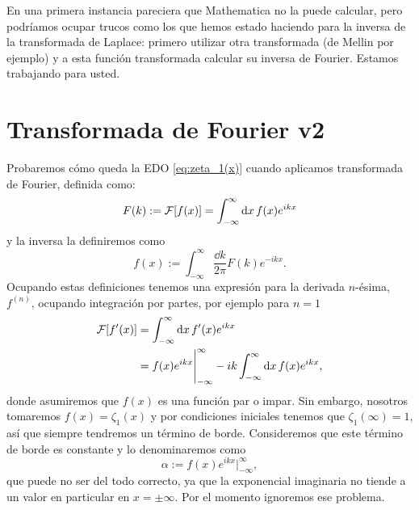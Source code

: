 \documentclass[%
 aip,
 jmp,%
 amsmath,amssymb,
 reprint,%
]{revtex4-2}
\begin{document}
En una primera instancia pareciera que Mathematica no la puede calcular, pero podr\'iamos ocupar trucos como los que hemos estado haciendo para la inversa de la transformada de Laplace: primero utilizar otra transformada (de Mellin por ejemplo) y a esta funci\'on transformada calcular su inversa de Fourier. Estamos trabajando para usted.

\newpage

\section{Transformada de Fourier v2}

Probaremos c\'omo queda la EDO \eqref{eq:zeta_1(x)} cuando aplicamos transformada de Fourier, definida como:
\begin{equation}
    F(k) := \mathcal{F}\qty[f(x)] = \int_{-\infty}^{\infty}\dd{x}f(x)e^{ikx}
\end{equation}
y la inversa la definiremos como
\begin{equation}
    f(x) := \int_{-\infty}^{\infty}\frac{\dd{k}}{2\pi}F(k)e^{-ikx}.
\end{equation}
Ocupando estas definiciones tenemos una expresi\'on para la derivada $n$-\'esima, $f^{(n)}$, ocupando integraci\'on por partes, por ejemplo para $n=1$
\begin{equation*}
\begin{aligned}
    \mathcal{F}\qty[f'(x)] &= \int_{-\infty}^{\infty} \dd{x} f'(x)e^{ikx}\\
    &= f(x)e^{ikx}\Bigg|_{-\infty}^\infty - ik\int_{-\infty}^{\infty} \dd{x} f(x)e^{ikx},
\end{aligned}
\end{equation*}
donde asumiremos que $f(x)$ es una funci\'on par o impar. Sin embargo, nosotros tomaremos $f(x) = \zeta_1(x)$ y por condiciones iniciales tenemos que $\zeta_1(\infty) = 1$, as\'i que siempre tendremos un t\'ermino de borde. Consideremos que este t\'ermino de borde es constante y lo denominaremos como
\begin{equation*}
    \alpha := f(x)e^{ikx}\Bigg|_{-\infty}^\infty,
\end{equation*}
que puede no ser del todo correcto, ya que la exponencial imaginaria no tiende a un valor en particular en $x=\pm\infty$. Por el momento ignoremos ese problema.
\end{document}
